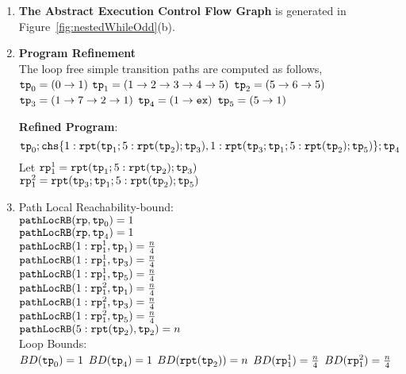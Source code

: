   \begin{enumerate}
    \item  \textbf{The Abstract Execution Control Flow Graph} is generated in Figure~\ref{fig:nestedWhileOdd}(b).
    \item \textbf{Program Refinement}
    \\
    The loop free simple transition paths are computed as follows,
      \\ 
    $\mathtt{tp}_0 = (0 \to 1)$
      \quad
      $\mathtt{tp}_1 = (1 \to 2 \to 3 \to 4 \to 5)$
      \quad
      $\mathtt{tp}_2 = (5 \to 6 \to 5)$
      \quad
      $\mathtt{tp}_3 = (1 \to 7 \to 2 \to 1)$
      \quad
      $\mathtt{tp}_4 = (1 \to \mathtt{ex})$
      \quad
      $\mathtt{tp}_5 = (5 \to 1)$

  \textbf{Refined Program}:
  \[
    \tpath_0 ; \rpchoose{1: \rprepeat(\tpath_1; 5:\rprepeat(\tpath_2); \tpath_3) , 
    1: \rprepeat(\tpath_3; \tpath_1; 5:\rprepeat(\tpath_2); \tpath_5 )}; \tpath_4
    \]
    Let $\mathtt{rp}_1^1 = \mathtt{rpt}(\mathtt{tp}_1; 5:\mathtt{rpt}(\mathtt{tp}_2); \mathtt{tp}_3)$
    \\
    $\mathtt{rp}_1^2 = \mathtt{rpt}(\mathtt{tp}_3; \mathtt{tp}_1; 5:\mathtt{rpt}(\mathtt{tp}_2) ; \mathtt{tp}_5 )$
    \item {Path Local Reachability-bound}:
    \\
    $\mathtt{pathLocRB}(\mathtt{rp}, \mathtt{tp}_0) = 1$ \\
    $\mathtt{pathLocRB}(\mathtt{rp}, \mathtt{tp}_4) = 1$ \\
    $\mathtt{pathLocRB}(1: \mathtt{rp}_1^1, \mathtt{tp}_1) = \frac{n}{4}$ \\
    $\mathtt{pathLocRB}(1: \mathtt{rp}_1^1, \mathtt{tp}_3) = \frac{n}{4}$ \\
    $\mathtt{pathLocRB}(1: \mathtt{rp}_1^1, \mathtt{tp}_5) = \frac{n}{4}$ \\
    $\mathtt{pathLocRB}(1: \mathtt{rp}_1^2, \mathtt{tp}_1) = \frac{n}{4}$ \\
    $\mathtt{pathLocRB}(1: \mathtt{rp}_1^2, \mathtt{tp}_3) = \frac{n}{4}$ \\
    $\mathtt{pathLocRB}(1: \mathtt{rp}_1^2, \mathtt{tp}_5) = \frac{n}{4}$ \\
    $\mathtt{pathLocRB}(5: \mathtt{rpt}(\mathtt{tp}_2), \mathtt{tp}_2) = n$ 
    \\
    Loop Bounds:
    \\
    $BD(\mathtt{tp}_0) = 1$
    \quad
    $BD(\mathtt{tp}_4) = 1$
    \quad
    $BD(\mathtt{rpt}(\mathtt{tp}_2)) = n $
    \quad
    $BD(\mathtt{rp}_1^1) = \frac{n}{4} $
    \quad
    $BD(\mathtt{rp}_1^2) = \frac{n}{4} $


\end{enumerate}
